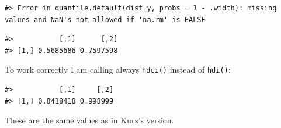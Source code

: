 \documentclass[
  letterpaper,
  DIV=11,
  numbers=noendperiod]{scrreprt}
\newenvironment{Shaded}{\begin{snugshade}}{\end{snugshade}}
\newcommand{\AttributeTok}[1]{\textcolor[rgb]{0.40,0.45,0.13}{#1}}
\newcommand{\CommentTok}[1]{\textcolor[rgb]{0.37,0.37,0.37}{#1}}
\newcommand{\ConstantTok}[1]{\textcolor[rgb]{0.56,0.35,0.01}{#1}}
\newcommand{\DecValTok}[1]{\textcolor[rgb]{0.68,0.00,0.00}{#1}}
\newcommand{\FunctionTok}[1]{\textcolor[rgb]{0.28,0.35,0.67}{#1}}
\newcommand{\InformationTok}[1]{\textcolor[rgb]{0.37,0.37,0.37}{#1}}
\newcommand{\NormalTok}[1]{\textcolor[rgb]{0.00,0.23,0.31}{#1}}
\newcommand{\SpecialCharTok}[1]{\textcolor[rgb]{0.37,0.37,0.37}{#1}}
\begin{document}
\begin{verbatim}
#> Error in quantile.default(dist_y, probs = 1 - .width): missing values and NaN's not allowed if 'na.rm' is FALSE
\end{verbatim}

\begin{Shaded}
\end{Shaded}

\begin{verbatim}
#>           [,1]      [,2]
#> [1,] 0.5685686 0.7597598
\end{verbatim}

To work correctly I am calling always \texttt{hdci()} instead of
\texttt{hdi()}:

\begin{Shaded}
\end{Shaded}

\begin{verbatim}
#>           [,1]     [,2]
#> [1,] 0.8418418 0.998999
\end{verbatim}

These are the same values as in Kurz's version.
\end{document}
